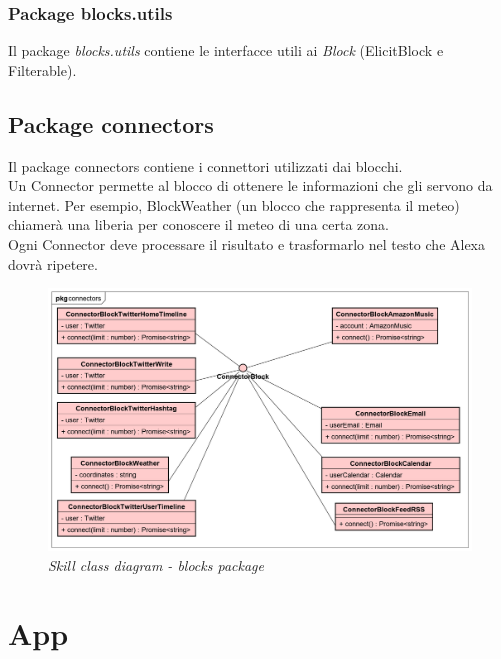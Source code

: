 \subsubsection{Package blocks.utils}
Il package \textit{blocks.utils} contiene le interfacce utili ai \textit{Block} (ElicitBlock e Filterable).
\subsection{Package connectors}
Il package connectors contiene i connettori utilizzati dai blocchi.\\
Un Connector permette al blocco di ottenere le informazioni che gli servono da internet. Per esempio, BlockWeather (un blocco che rappresenta il meteo) chiamerà una liberia per conoscere il meteo di una certa zona.\\
Ogni Connector deve processare il risultato e trasformarlo nel testo che Alexa dovrà ripetere.
\begin{figure} [H]
    \centering
	\includegraphics[scale=0.3]{./images/ZeroSevenClassConnectors.png}
	\caption{\textit{Skill class diagram - blocks package}}\label{classlambda}
\end{figure}

\newpage
\section{App}\label{architetturaApp}

